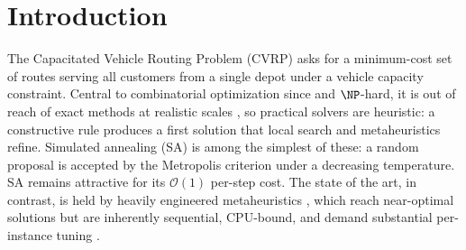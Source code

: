 \documentclass[letterpaper]{article} %
\begin{document}




\section{Introduction}

The Capacitated Vehicle Routing Problem (CVRP) asks for a minimum-cost set of routes serving all customers from a single depot under a vehicle capacity constraint. Central to combinatorial optimization since \citet{dantzig_truck_1959} and $\NP$-hard, it is out of reach of exact methods at realistic scales \citep{toth_vehicle_2002}, so practical solvers are heuristic: a constructive rule \citep{clarke_scheduling_1964} produces a first solution that local search and metaheuristics refine. Simulated annealing (SA) \citep{kirkpatrick_optimization_1983} is among the simplest of these: a random proposal is accepted by the Metropolis criterion under a decreasing temperature. SA remains attractive for its $\mathcal{O}(1)$ per-step cost. The state of the art, in contrast, is held by heavily engineered metaheuristics \citep{vidal_hybrid_2022,helsgaun_extension_2017,accorsi_fast_2021}, which reach near-optimal solutions but are inherently sequential, CPU-bound, and demand substantial per-instance tuning \citep{liu_heuristics_2023}.
\end{document}
